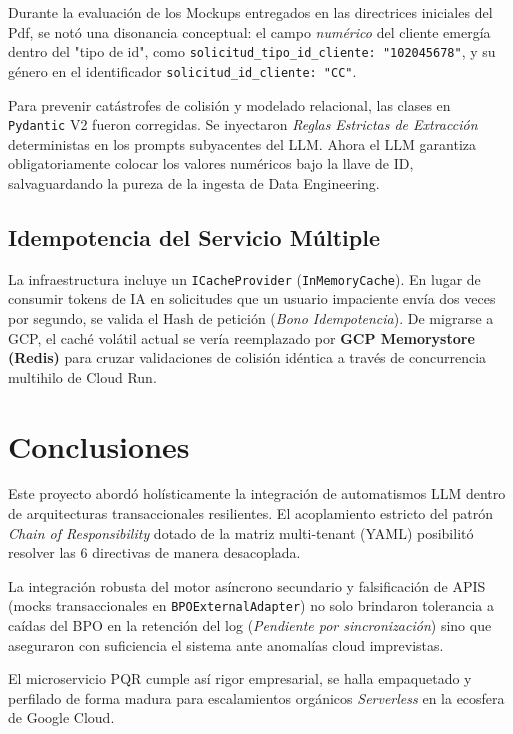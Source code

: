 \documentclass[twocolumn]{article}
\numberwithin{definition}{subsection}
\begin{document}
Durante la evaluación de los Mockups entregados en las directrices iniciales del Pdf, se notó una disonancia conceptual: el campo \textit{numérico} del cliente emergía dentro del "tipo de id", como \texttt{solicitud\_tipo\_id\_cliente: "102045678"}, y su género en el identificador \texttt{solicitud\_id\_cliente: "CC"}. 

Para prevenir catástrofes de colisión y modelado relacional, las clases en \texttt{Pydantic} V2 fueron corregidas. Se inyectaron \textit{Reglas Estrictas de Extracción} deterministas en los prompts subyacentes del LLM. Ahora el LLM garantiza obligatoriamente colocar los valores numéricos bajo la llave de ID, salvaguardando la pureza de la ingesta de Data Engineering.

\subsection{Idempotencia del Servicio Múltiple}

La infraestructura incluye un \texttt{ICacheProvider} (\texttt{InMemoryCache}). En lugar de consumir tokens de IA en solicitudes que un usuario impaciente envía dos veces por segundo, se valida el Hash de petición (\textit{Bono Idempotencia}). De migrarse a GCP, el caché volátil actual se vería reemplazado por \textbf{GCP Memorystore (Redis)} para cruzar validaciones de colisión idéntica a través de concurrencia multihilo de Cloud Run.

\section{Conclusiones}

Este proyecto abordó holísticamente la integración de automatismos LLM dentro de arquitecturas transaccionales resilientes. El acoplamiento estricto del patrón \textit{Chain of Responsibility} dotado de la matriz multi-tenant (YAML) posibilitó resolver las 6 directivas de manera desacoplada.  

La integración robusta del motor asíncrono secundario y falsificación de APIS (mocks transaccionales en \texttt{BPOExternalAdapter}) no solo brindaron tolerancia a caídas del BPO en la retención del log (\textit{Pendiente por sincronización}) sino que aseguraron con suficiencia el sistema ante anomalías cloud imprevistas. 

El microservicio PQR cumple así rigor empresarial, se halla empaquetado y perfilado de forma madura para escalamientos orgánicos \textit{Serverless} en la ecosfera de Google Cloud.
\end{document}
